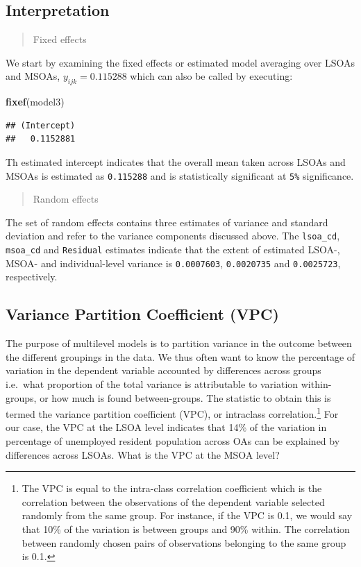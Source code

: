\documentclass[]{book}
\newenvironment{Shaded}{\begin{snugshade}}{\end{snugshade}}
\newcommand{\KeywordTok}[1]{\textcolor[rgb]{0.13,0.29,0.53}{\textbf{#1}}}
\newcommand{\NormalTok}[1]{#1}
\begin{document}
\subsection{Interpretation}\label{interpretation}

\begin{quote}
Fixed effects
\end{quote}

We start by examining the fixed effects or estimated model averaging
over LSOAs and MSOAs, \(y_{ijk} = 0.115288\) which can also be called by
executing:

\begin{Shaded}
\begin{Highlighting}[]
\KeywordTok{fixef}\NormalTok{(model3)}
\end{Highlighting}
\end{Shaded}

\begin{verbatim}
## (Intercept) 
##   0.1152881
\end{verbatim}

Th estimated intercept indicates that the overall mean taken across
LSOAs and MSOAs is estimated as \texttt{0.115288} and is statistically
significant at \texttt{5\%} significance.

\begin{quote}
Random effects
\end{quote}

The set of random effects contains three estimates of variance and
standard deviation and refer to the variance components discussed above.
The \texttt{lsoa\_cd}, \texttt{msoa\_cd} and \texttt{Residual} estimates
indicate that the extent of estimated LSOA-, MSOA- and individual-level
variance is \texttt{0.0007603}, \texttt{0.0020735} and
\texttt{0.0025723}, respectively.

\subsection{Variance Partition Coefficient
(VPC)}\label{variance-partition-coefficient-vpc}

The purpose of multilevel models is to partition variance in the outcome
between the different groupings in the data. We thus often want to know
the percentage of variation in the dependent variable accounted by
differences across groups i.e.~what proportion of the total variance is
attributable to variation within-groups, or how much is found
between-groups. The statistic to obtain this is termed the variance
partition coefficient (VPC), or intraclass correlation.\footnote{The VPC
  is equal to the intra-class correlation coefficient which is the
  correlation between the observations of the dependent variable
  selected randomly from the same group. For instance, if the VPC is
  0.1, we would say that 10\% of the variation is between groups and
  90\% within. The correlation between randomly chosen pairs of
  observations belonging to the same group is 0.1.} For our case, the
VPC at the LSOA level indicates that 14\% of the variation in percentage
of unemployed resident population across OAs can be explained by
differences across LSOAs. What is the VPC at the MSOA level?
\end{document}
